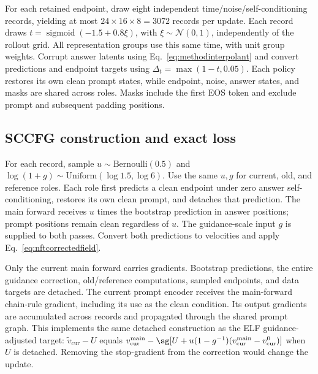 For each retained endpoint, draw eight independent time/noise/self-conditioning records, yielding at most $24\times16\times8=3072$ records per update. Each record draws $t=\operatorname{sigmoid}(-1.5+0.8\xi)$, with $\xi\sim\mathcal N(0,1)$, independently of the rollout grid. All representation groups use this same time, with unit group weights. Corrupt answer latents using Eq.~\eqref{eq:methodinterpolant} and convert predictions and endpoint targets using $\Delta_t=\max(1-t,0.05)$. Each policy restores its own clean prompt states, while endpoint, noise, answer states, and masks are shared across roles. Masks include the first EOS token and exclude prompt and subsequent padding positions.

\subsection{SCCFG construction and exact loss}

For each record, sample $u\sim\mathrm{Bernoulli}(0.5)$ and $\log(1+g)\sim\mathrm{Uniform}(\log1.5,\log6)$. Use the same $u,g$ for current, old, and reference roles. Each role first predicts a clean endpoint under zero answer self-conditioning, restores its own clean prompt, and detaches that prediction. The main forward receives $u$ times the bootstrap prediction in answer positions; prompt positions remain clean regardless of $u$. The guidance-scale input $g$ is supplied to both passes. Convert both predictions to velocities and apply Eq.~\eqref{eq:nftcorrectedfield}.

Only the current main forward carries gradients. Bootstrap predictions, the entire guidance correction, old/reference computations, sampled endpoints, and data targets are detached. The current prompt encoder receives the main-forward chain-rule gradient, including its use as the clean condition. Its output gradients are accumulated across records and propagated through the shared prompt graph. This implements the same detached construction as the ELF guidance-adjusted target: $\widetilde v_{\mathrm{cur}}-U$ equals $v_{\mathrm{cur}}^{\mathrm{main}}-\sg[U+u(1-g^{-1})(v_{\mathrm{cur}}^{\mathrm{main}}-v_{\mathrm{cur}}^0)]$ when $U$ is detached. Removing the stop-gradient from the correction would change the update.

